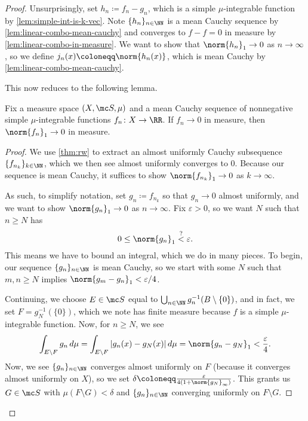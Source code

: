 \documentclass[../notes.tex]{subfiles}
\begin{document}
\begin{proof}
	Unsurprisingly, set $h_n\coloneqq f_n-g_n$, which is a simple $\mu$-integrable function by \autoref{lem:simple-int-is-k-vec}. Note $\{h_n\}_{n\in\NN}$ is a mean Cauchy sequence by \autoref{lem:linear-combo-mean-cauchy} and converges to $f-f=0$ in measure by \autoref{lem:linear-combo-in-measure}. We want to show that $\norm{h_n}_1\to0$ as $n\to\infty$, so we define $j_n(x)\coloneqq\norm{h_n(x)}$, which is mean Cauchy by \autoref{lem:linear-combo-mean-cauchy}.

	This now reduces to the following lemma.
	\begin{lemma}
		Fix a measure space $(X,\mc S,\mu)$ and a mean Cauchy sequence of nonnegative simple $\mu$-integrable functions $f_n\colon X\to\RR$. If $f_n\to0$ in measure, then $\norm{f_n}_1\to0$ in measure.
	\end{lemma}
	\begin{proof}
		We use \autoref{thm:rw} to extract an almost uniformly Cauchy subsequence $\{f_{n_k}\}_{k\in\NN}$, which we then see almost uniformly converges to $0$. Because our sequence is mean Cauchy, it suffices to show $\norm{f_{n_k}}_1\to0$ as $k\to\infty$.

		As such, to simplify notation, set $g_n\coloneqq f_{n_k}$ so that $g_n\to0$ almost uniformly, and we want to show $\norm{g_n}_1\to0$ as $n\to\infty$. Fix $\varepsilon>0$, so we want $N$ such that $n\ge N$ has
		\[0\le\norm{g_n}_1\stackrel?<\varepsilon.\]
		This means we have to bound an integral, which we do in many pieces. To begin, our sequence $\{g_n\}_{n\in\NN}$ is mean Cauchy, so we start with some $N$ such that $m,n\ge N$ implies $\norm{g_m-g_n}_1<\varepsilon/4$.
		
		Continuing, we choose $E\in\mc S$ equal to $\bigcup_{n\in\NN}g_n^{-1}(B\setminus\{0\})$, and in fact, we set $F=g_N^{-1}(\{0\})$, which we note has finite measure because $f$ is a simple $\mu$-integrable function. Now, for $n\ge N$, we see
		\[\int_{E\setminus F}g_n\,d\mu=\int_{E\setminus F}|g_n(x)-g_N(x)|\,d\mu=\norm{g_n-g_N}_1<\frac\varepsilon4.\]
		Now, we see $\{g_n\}_{n\in\NN}$ converges almost uniformly on $F$ (because it converges almost uniformly on $X$), so we set $\delta\coloneqq\frac\varepsilon{4(1+\norm{g_N}_\infty)}$. This grants us $G\in\mc S$ with $\mu(F\setminus G)<\delta$ and $\{g_n\}_{n\in\NN}$ converging uniformly on $F\setminus G$.


\end{proof}
\end{proof}
\end{document}
